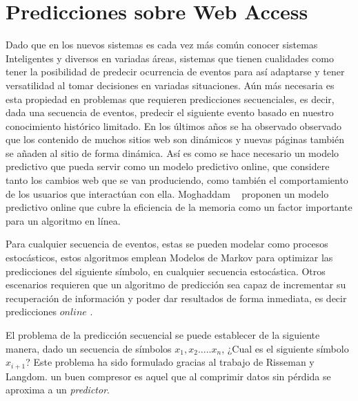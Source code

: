 \chapter[Predicciones sobre Web Access]{Predicciones sobre Web Access} \label{ch:tema}





Dado que en los nuevos sistemas es cada vez más común conocer sistemas Inteligentes y diversos en variadas áreas, sistemas que tienen cualidades como tener la posibilidad de predecir ocurrencia de eventos para así adaptarse y tener versatilidad al tomar decisiones en variadas situaciones. Aún más necesaria es esta propiedad en problemas que requieren predicciones secuenciales, es decir, dada una secuencia de eventos,  predecir el siguiente evento basado en nuestro conocimiento histórico limitado.
En los últimos años se ha observado observado que  los contenido de muchos sitios web son dinámicos y nuevas páginas también se añaden al sitio de forma dinámica. Así es como  se hace necesario un modelo predictivo que pueda servir como un modelo predictivo online,  que considere tanto los cambios web que se van produciendo, como también el comportamiento de los usuarios que interactúan con ella. 
Moghaddam \etal~\cite{Moghaddam2009} proponen un modelo predictivo online que cubre la eficiencia de la memoria como un factor importante para un algoritmo en línea. 

Para cualquier secuencia de eventos, estas se pueden modelar como procesos estocásticos, estos algoritmos emplean Modelos de Markov para optimizar las predicciones del siguiente símbolo, en cualquier secuencia estocástica. Otros escenarios requieren que un algoritmo de predicción sea capaz de incrementar su recuperación de información  y poder dar resultados de forma inmediata, es decir predicciones $online$ .

El problema de la predicción secuencial se puede establecer de la siguiente manera, dado un secuencia de símbolos $x_{1}, x_{2}.....x_{n}$, ¿Cual es el siguiente símbolo $x_{i+1}$? Este problema ha sido formulado gracias al trabajo de  Risseman\cite{Rissanen1983} y Langdom\cite{Langdon1983}.  %
un buen compresor es aquel que al comprimir datos sin pérdida se aproxima a un \emph{predictor}.

